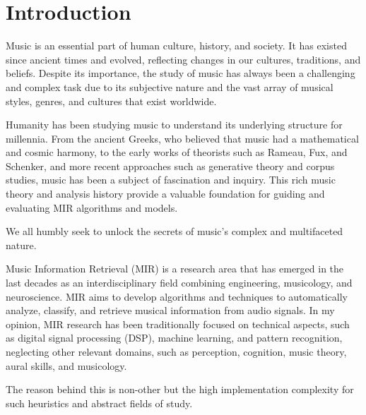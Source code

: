 \chapter{Introduction}

Music is an essential part of human culture, history, and society. It has existed since ancient times and evolved, reflecting changes in our cultures, traditions, and beliefs. Despite its importance, the study of music has always been a challenging and complex task due to its subjective nature and the vast array of musical styles, genres, and cultures that exist worldwide.

Humanity has been studying music to understand its underlying structure for millennia. From the ancient Greeks, who believed that music had a mathematical and cosmic harmony, to the early works of theorists such as Rameau, Fux, and Schenker, and more recent approaches such as generative theory and corpus studies, music has been a subject of fascination and inquiry. This rich music theory and analysis history provide a valuable foundation for guiding and evaluating MIR algorithms and models. 

We all humbly seek to unlock the secrets of music's complex and multifaceted nature.

Music Information Retrieval (MIR) is a research area that has emerged in the last decades as an interdisciplinary field combining engineering, musicology, and neuroscience. MIR aims to develop algorithms and techniques to automatically analyze, classify, and retrieve musical information from audio signals. In my opinion, MIR research has been traditionally focused on technical aspects, such as digital signal processing (DSP), machine learning, and pattern recognition, neglecting other relevant domains, such as perception, cognition, music theory, aural skills, and musicology.

The reason behind this is non-other but the high implementation complexity for such heuristics and abstract fields of study.


